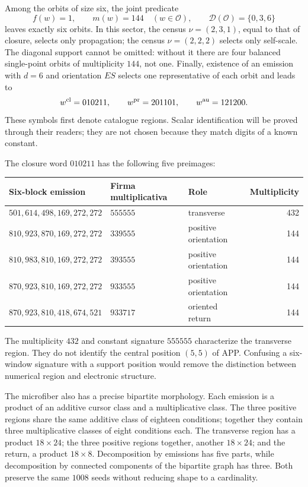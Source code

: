Among the orbits of size six, the joint predicate
\[
 f(w)=1,\qquad m(w)=144\quad(w\in\mathcal O),\qquad
 \mathcal D(\mathcal O)=\{0,3,6\}
\]
leaves exactly six orbits. In this sector, the census \(\nu=(2,3,1)\), equal to that of closure, selects only propagation; the census \(\nu=(2,2,2)\) selects only self-scale. The diagonal support cannot be omitted: without it there are four balanced single-point orbits of multiplicity \(144\), not one. Finally, existence of an emission with \(d=6\) and orientation \(ES\) selects one representative of each orbit and leads to
\begin{equation}
 w^{\rm cl}=010211,\qquad w^{\rm pr}=201101,\qquad w^{\rm au}=121200.
 \label{x_reciprocidad:eq:palabras-regionales}
\end{equation}
These symbols first denote catalogue regions. Scalar identification will be proved through their readers; they are not chosen because they match digits of a known constant.

The closure word \(010211\) has the following five preimages:
\begin{center}\small
\begin{tabular}{@{}lll r@{}}\toprule
Six-block emission&Firma multiplicativa&Role&Multiplicity\\\midrule
\(501,614,498,169,272,272\)&\(555555\)&transverse&432\\
\(810,923,870,169,272,272\)&\(339555\)&positive orientation&144\\
\(810,983,810,169,272,272\)&\(393555\)&positive orientation&144\\
\(870,923,810,169,272,272\)&\(933555\)&positive orientation&144\\
\(870,923,810,418,674,521\)&\(933717\)&oriented return&144\\\bottomrule
\end{tabular}
\end{center}
The multiplicity \(432\) and constant signature \(555555\) characterize the transverse region. They do not identify the central position \((5,5)\) of APP. Confusing a six-window signature with a support position would remove the distinction between numerical region and electronic structure.

The microfiber also has a precise bipartite morphology. Each emission is a product of an additive cursor class and a multiplicative class. The three positive regions share the same additive class of eighteen conditions; together they contain three multiplicative classes of eight conditions each. The transverse region has a product \(18\times24\); the three positive regions together, another \(18\times24\); and the return, a product \(18\times8\). Decomposition by emissions has five parts, while decomposition by connected components of the bipartite graph has three. Both preserve the same \(1008\) seeds without reducing shape to a cardinality.

